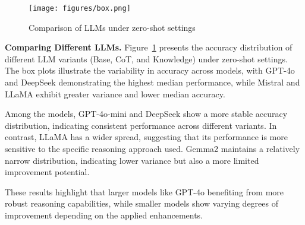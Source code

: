 \begin{figure}[ht]
    \centering
    \texttt{[image: figures/box.png]}
    \caption{Comparison of LLMs under zero-shot settings}
    \label{box}
\end{figure}

\textbf{Comparing Different LLMs.} Figure~\ref{box} presents the accuracy distribution of different LLM variants (Base, CoT, and Knowledge) under zero-shot settings. The box plots illustrate the variability in accuracy across models, with GPT-4o and DeepSeek demonstrating the highest median performance, while Mistral and LLaMA exhibit greater variance and lower median accuracy.

Among the models, GPT-4o-mini and DeepSeek show a more stable accuracy distribution, indicating consistent performance across different variants. In contrast, LLaMA has a wider spread, suggesting that its performance is more sensitive to the specific reasoning approach used. Gemma2 maintains a relatively narrow distribution, indicating lower variance but also a more limited improvement potential.

These results highlight that larger models like GPT-4o benefiting from more robust reasoning capabilities, while smaller models show varying degrees of improvement depending on the applied enhancements.

